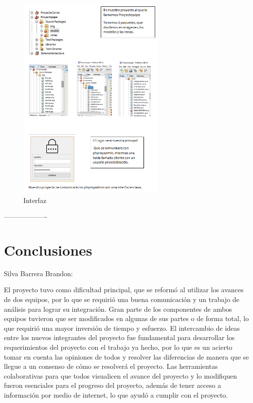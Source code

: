 \documentclass[30pt,fleqn]{article}
\begin{document}
\begin{figure}[h]
    \centering
    \includegraphics[width=0.65\textwidth]{presentación.png}
    \caption{Interfaz}
    \label{fig:Interfaz}
\end{figure}


-------------------

\newpage
\section{Conclusiones}

Silva Barrera Brandon: 

El proyecto tuvo como dificultad principal, que se reformó al utilizar los avances de dos equipos, por lo que se requirió una buena comunicación y un trabajo de análisis para lograr su integración. Gran parte de los componentes de ambos equipos tuvieron que ser modificados en algunas de sus partes o de forma total, lo que requirió una mayor inversión de tiempo y esfuerzo. El intercambio de ideas entre los nuevos integrantes del proyecto fue fundamental para desarrollar los requerimientos del proyecto con el trabajo ya hecho, por lo que es un acierto tomar en cuenta las opiniones de todos y resolver las diferencias de manera que se llegue a un consenso de cómo se resolverá el proyecto. Las herramientas colaborativas para que todos visualicen el avance del proyecto y lo modifiquen fueron esenciales para el progreso del proyecto, además de tener acceso a información por medio de internet, lo que ayudó a cumplir con el proyecto.
\end{document}
